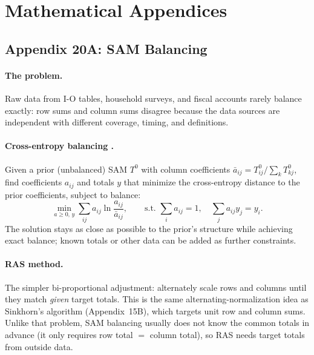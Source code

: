 \documentclass[../structural_economics_book.tex]{subfiles}
\begin{document}
\newpage
\section*{Mathematical Appendices}


\subsection*{Appendix 20A: SAM Balancing}
\label{ch20:app:balancing}

\paragraph{The problem.} Raw data from I-O tables, household surveys, and fiscal accounts rarely balance exactly: row sums and column sums disagree because the data sources are independent with different coverage, timing, and definitions.

\paragraph{Cross-entropy balancing \citep*{robinson2001updating}.} Given a prior (unbalanced) SAM $T^0$ with column coefficients $\bar a_{ij} = T^0_{ij}/\sum_k T^0_{kj}$, find coefficients $a_{ij}$ and totals $y$ that minimize the cross-entropy distance to the prior coefficients, subject to balance:
\begin{equation}
\min_{a \geq 0,\, y} \sum_{ij} a_{ij} \ln\frac{a_{ij}}{\bar a_{ij}}, \qquad \text{s.t. } \sum_i a_{ij} = 1, \quad \sum_j a_{ij} y_j = y_i .
\end{equation}
The solution stays as close as possible to the prior's structure while achieving exact balance; known totals or other data can be added as further constraints.

\paragraph{RAS method.} The simpler bi-proportional adjustment: alternately scale rows and columns until they match \emph{given} target totals. This is the same alternating-normalization idea as Sinkhorn's algorithm (Appendix~15B), which targets unit row and column sums. Unlike that problem, SAM balancing usually does not know the common totals in advance (it only requires row total $=$ column total), so RAS needs target totals from outside data.
\end{document}
